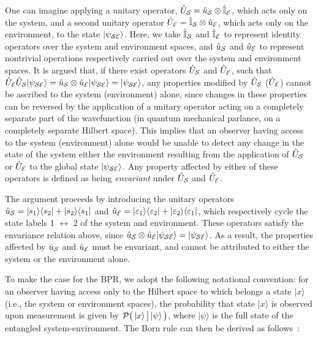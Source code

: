 \documentclass[12pt]{iopart}
\begin{document}
One can imagine applying a unitary operator, $\hat{U}_{\cal{S}}=\hat{u}_{\cal{S}} \otimes \hat{\mathbb{I}}_{\cal{E}}$, which acts only on the system, and a second unitary operator $\hat{U}_{\cal{E}}=\hat{\mathbb{I}}_{\cal{S}} \otimes \hat{u}_{\cal{E}}$, which acts only on the environment, to the state $|\psi_{\cal SE}\rangle$. Here, we take $\hat{\mathbb{I}}_{\cal{S}}$ and $\hat{\mathbb{I}}_{\cal{E}}$ to represent identity operators over the system and environment spaces, and $\hat{u}_{\cal{S}}$ and $\hat{u}_{\cal{E}}$ to represent nontrivial operations respectively carried out over the system and environment spaces. It is argued that, if there exist operators $\hat{U}_{\cal{S}}$ and $\hat{U}_{\cal{E}}$, such that $\hat{U}_{\cal{E}} \hat{U}_{\cal{S}}|\psi_{\cal SE}\rangle=\hat{u}_{\cal{S}} \otimes \hat{u}_{\cal{E}}|\psi_{\cal SE}\rangle=|\psi_{\cal SE}\rangle$, any properties modified by $\hat{U}_{\cal{S}}$ ($\hat{U}_{\cal{E}}$) cannot be ascribed to the system (environment) alone, since changes in these properties can be reversed by the application of a unitary operator acting on a completely separate part of the wavefunction (in quantum mechanical parlance, on a completely separate Hilbert space). This implies that an observer having access to the system (environment) alone would be unable to detect any change in the state of the system either the environment resulting from the application of $\hat{U}_{\cal{S}}$ or $\hat{U}_{\cal{E}}$ to the global state $|\psi_{\cal SE}\rangle$. Any property affected by either of these operators is defined as being \textit{envariant} under $\hat{U}_{\cal{S}}$ and $\hat{U}_{\cal{E}}$. 

The argument proceeds by introducing the unitary  operators $\hat{u}_{\cal{S}}=|s_1\rangle\langle s_2| + |s_2 \rangle \langle s_1|$ and $\hat{u}_{\cal{E}}=|\varepsilon_1\rangle\langle \varepsilon_2| + |\varepsilon_2 \rangle \langle \varepsilon_1|$, which respectively cycle the state labels 1 $\longleftrightarrow$ 2 of the system and environment. These operators satisfy the envariance relation above, since $\hat{u}_{\cal S}\otimes\hat{u}_{\cal E} |\psi_{\cal SE}\rangle= |\psi_{\cal SE}\rangle$. As a result, the properties affected by $\hat{u}_{\cal S}$ and $\hat{u}_{\cal E}$ must be envariant, and cannot be attributed to either the system or the environment alone. 

To make the case for the BPR, we adopt the following notational convention: for an observer having access only to the Hilbert space to which belongs a state $|x\rangle$ (i.e., the system or environment spaces), the probability that state $|x\rangle$ is observed upon measurement is given by ${\cal P}\big(\left| x \right\rangle{\big |}\left| \psi \right\rangle\big)$, where $|\psi\rangle$ is the full state of the entangled system-environment. The Born rule can then be derived as follows~\cite{zurek:05,schlosshauer:05b}:
\end{document}
